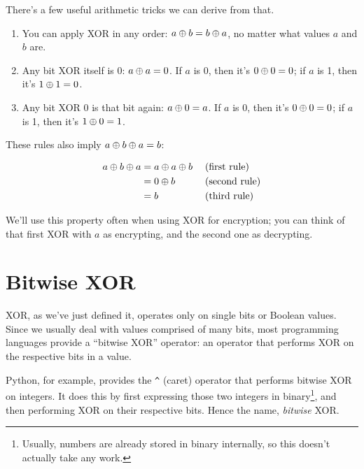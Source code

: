 \documentclass[11pt,ebook,table,dvipsnames]{memoir}
\begin{document}
There's a few useful arithmetic tricks we can derive from that.

\begin{enumerate}
\item You can apply XOR in any order: $a \oplus b = b \oplus a$, no matter
what values $a$ and $b$ are.
\item Any bit XOR itself is 0: $a \oplus a = 0$. If $a$ is 0, then it's $0
   \oplus 0 = 0$; if $a$ is 1, then it's $1 \oplus 1 = 0$.
\item Any bit XOR 0 is that bit again: $a \oplus 0 = a$. If $a$ is 0, then
it's $0 \oplus 0 = 0$; if $a$ is 1, then it's $1 \oplus 0 = 1$.
\end{enumerate}

These rules also imply $a \oplus b \oplus a = b$:

\begin{align*}
a \oplus b \oplus a & = a \oplus a \oplus b & \; & \text{(first rule)} \\
                & = 0 \oplus b        & \; & \text{(second rule)} \\
                & = b               & \; & \text{(third rule)}
\end{align*}

We'll use this property often when using XOR for encryption; you can
think of that first XOR with $a$ as encrypting, and the second one as
decrypting.
\section{Bitwise XOR}
\label{sec-2-1-3}

XOR, as we've just defined it, operates only on single bits or Boolean
values. Since we usually deal with values comprised of many bits, most
programming languages provide a \enquote{bitwise XOR} operator: an operator
that performs XOR on the respective bits in a value.

Python, for example, provides the \verb~^~ (caret) operator that performs
bitwise XOR on integers. It does this by first expressing those two
integers in binary\footnote{Usually, numbers are already stored in binary
internally, so this doesn't actually take any work.}, and then
performing XOR on their respective bits. Hence the name, \emph{bitwise}
XOR.
\end{document}
